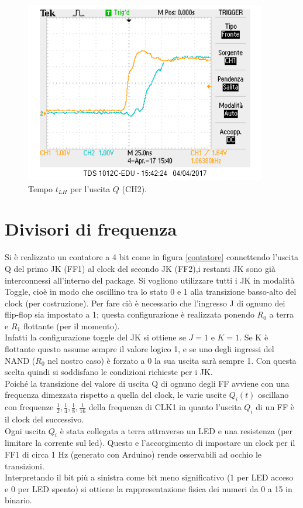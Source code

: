 \documentclass[10pt,a4paper]{article}
\begin{document}
\begin{figure}
\centering
\includegraphics[scale=1.0]{tplhQ.png}
\caption{Tempo $t_{LH}$ per l'uscita $Q$ (CH2).\label{q2}}
\end{figure}



\section{Divisori di frequenza}
Si è realizzato un contatore a 4 bit come in figura \ref{contatore} connettendo l'uscita Q del primo JK (FF1) al clock del secondo JK (FF2),i restanti JK sono già interconnessi all'interno del package. Si vogliono utilizzare tutti i JK in modalità Toggle, cioè in modo che oscillino tra lo stato 0 e 1 alla transizione basso-alto del clock (per costruzione). Per fare ciò è necessario che l'ingresso J di ognuno dei flip-flop sia impostato a 1; questa configurazione è realizzata ponendo $R_0$ a terra e $R_1$ flottante (per il momento).\\
Infatti la configurazione toggle del JK si ottiene se $J = 1$ e $K = 1$. Se K è flottante questo assume sempre il valore logico 1, e se uno degli ingressi del NAND ($R_0$ nel nostro caso) è forzato a 0 la sua uscita sarà sempre 1. Con questa scelta quindi si soddisfano le condizioni richieste per i JK.\\  
Poiché la transizione del valore di uscita Q di ognuno degli FF avviene con una frequenza dimezzata rispetto a quella del clock, le varie uscite $Q_i(t)$ oscillano con frequenze $\frac{1}{2}, \frac{1}{4}, \frac{1}{8}, \frac{1}{16}$ della frequenza di CLK1 in quanto l'uscita $Q_i$ di un FF è il clock del successivo.\\
Ogni uscita $Q_i$ è stata collegata a terra attraverso un LED e una resistenza (per limitare la corrente sul led). Questo e l'accorgimento di impostare un clock per il FF1 di circa 1 Hz (generato con Arduino)%
 rende osservabili ad occhio le transizioni.\\
Interpretando il bit più a sinistra come bit meno significativo (1 per LED acceso e 0 per LED spento) si ottiene la rappresentazione fisica dei numeri da 0 a 15 in binario.\\
\end{document}
